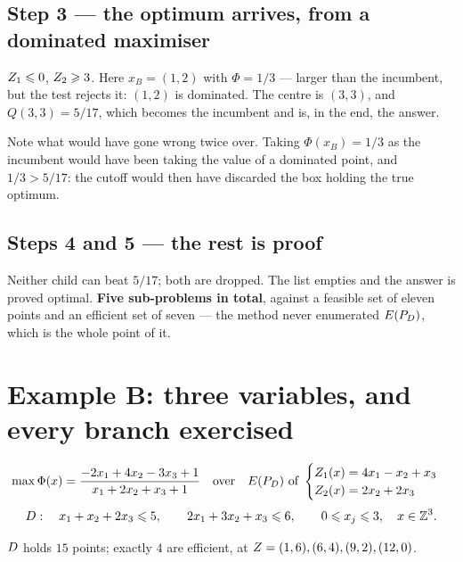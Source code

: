 \documentclass[11pt,a4paper]{article}
\begin{document}
\subsection*{Step 3 --- the optimum arrives, from a dominated maximiser}
\begin{center}\end{center}
$Z_1 \leqslant 0$, $Z_2 \geqslant 3$.  Here $x_B = (1,2)$ with $\Phi = 1/3$ ---
larger than the incumbent, but the test rejects it: $(1,2)$ is dominated.  The
centre is $(3,3)$, and $Q(3,3) = 5/17$, which becomes the incumbent and is, in
the end, the answer.

Note what would have gone wrong twice over.  Taking $\Phi(x_B) = 1/3$ as the
incumbent would have been taking the value of a dominated point, and $1/3 >
5/17$: the cutoff would then have discarded the box holding the true optimum.

\subsection*{Steps 4 and 5 --- the rest is proof}
\begin{center}\quad{}\end{center}
Neither child can beat $5/17$; both are dropped.  The list empties and the
answer is proved optimal.  \textbf{Five sub-problems in total}, against a
feasible set of eleven points and an efficient set of seven --- the method never
enumerated $E(P_{D})$, which is the whole point of it.

\section{Example B: three variables, and every branch exercised}

\begin{equation*}
\max \Phi(x) = \frac{-2x_1 + 4x_2 - 3x_3 + 1}{x_1 + 2x_2 + x_3 + 1}
\quad\text{over}\quad
E(P_{D}) \ \text{of} \
\begin{cases}
  Z_1(x) = 4x_1 - x_2 + x_3 \\ Z_2(x) = 2x_2 + 2x_3
\end{cases}
\end{equation*}
\begin{equation*}
D : \quad x_1 + x_2 + 2x_3 \leqslant 5, \qquad
2x_1 + 3x_2 + x_3 \leqslant 6, \qquad
0 \leqslant x_j \leqslant 3, \quad x \in \mathbb{Z}^3 .
\end{equation*}

$D$ holds $15$ points; exactly $4$ are efficient, at
$Z = (1,6), (6,4), (9,2), (12,0)$.
\end{document}
